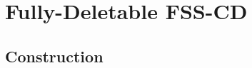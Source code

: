 \section{Fully-Deletable FSS-CD}\label{sec:strong-fss-cd}

\subsection{Construction}

\subsection{}

\subsection{}

